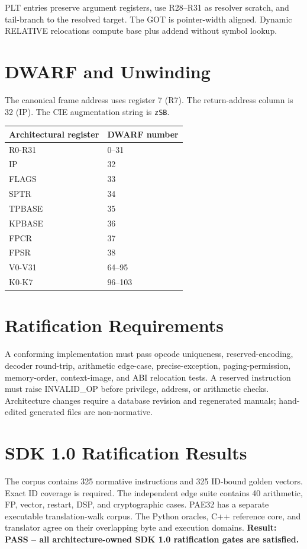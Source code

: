 \documentclass[10pt]{article}
\begin{document}
PLT entries preserve argument registers, use R28--R31 as resolver scratch, and tail-branch to the resolved target. The GOT is pointer-width aligned. Dynamic RELATIVE relocations compute base plus addend without symbol lookup.

\section{DWARF and Unwinding}
The canonical frame address uses register 7 (R7). The return-address column is 32 (IP). The CIE augmentation string is \texttt{zSB}.
\begin{longtable}{@{}L{4cm}L{4cm}@{}}
\toprule Architectural register & DWARF number \\ \midrule
R0-R31 & 0--31 \\
IP & 32 \\
FLAGS & 33 \\
SPTR & 34 \\
TPBASE & 35 \\
KPBASE & 36 \\
FPCR & 37 \\
FPSR & 38 \\
V0-V31 & 64--95 \\
K0-K7 & 96--103 \\
\bottomrule\end{longtable}
\section{Ratification Requirements}

A conforming implementation must pass opcode uniqueness, reserved-encoding, decoder round-trip, arithmetic edge-case, precise-exception, paging-permission, memory-order, context-image, and ABI relocation tests. A reserved instruction must raise INVALID\_OP before privilege, address, or arithmetic checks. Architecture changes require a database revision and regenerated manuals; hand-edited generated files are non-normative.

\section{SDK 1.0 Ratification Results}
The corpus contains 325 normative instructions and 325 ID-bound golden vectors. Exact ID coverage is required. The independent edge suite contains 40 arithmetic, FP, vector, restart, DSP, and cryptographic cases. PAE32 has a separate executable translation-walk corpus. The Python oracles, C++ reference core, and translator agree on their overlapping byte and execution domains.
\textbf{Result: PASS -- all architecture-owned SDK 1.0 ratification gates are satisfied.}
\end{document}
